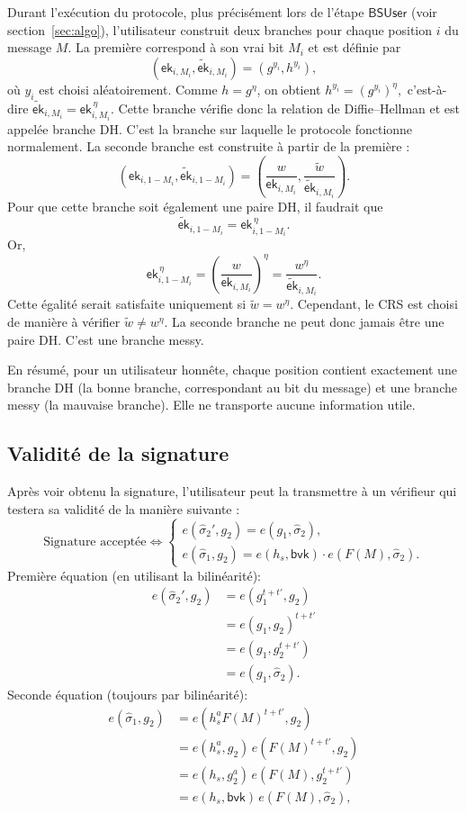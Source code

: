 \documentclass[10pt,a4paper]{article}
\theoremstyle{definition}
\theoremstyle{plain}
\theoremstyle{remark}
\begin{document}
Durant l'exécution du protocole, plus précisément lors de l'étape $\mathsf{BSUser}$ (voir section~\ref{sec:algo}),
l'utilisateur construit deux branches pour chaque position $i$ du message $M$.
La première correspond à son vrai bit $M_i$ et est définie par
\[
(\mathsf{ek}_{i,M_i},\widetilde{\mathsf{ek}}_{i,M_i})
=
(g^{y_i},h^{y_i}),
\]
où $y_i$ est choisi aléatoirement.
Comme $h=g^\eta$, on obtient
$
h^{y_i}=(g^{y_i})^\eta,
$
c'est-à-dire
$
\widetilde{\mathsf{ek}}_{i,M_i}
=
\mathsf{ek}_{i,M_i}^{\,\eta}.
$
Cette branche vérifie donc la relation de Diffie--Hellman et est appelée branche DH.
C'est la branche sur laquelle le protocole fonctionne normalement.
La seconde branche est construite à partir de la première :
\[
(\mathsf{ek}_{i,1-M_i},
\widetilde{\mathsf{ek}}_{i,1-M_i})
=
\left(
\frac{w}{\mathsf{ek}_{i,M_i}},
\frac{\widetilde w}{\widetilde{\mathsf{ek}}_{i,M_i}}
\right).
\]
Pour que cette branche soit également une paire DH, il faudrait que
\[
\widetilde{\mathsf{ek}}_{i,1-M_i}
=
\mathsf{ek}_{i,1-M_i}^{\,\eta}.
\]
Or,
\[
\mathsf{ek}_{i,1-M_i}^{\,\eta}
=
\left(\frac{w}{\mathsf{ek}_{i,M_i}}\right)^\eta
=
\frac{w^\eta}{\widetilde{\mathsf{ek}}_{i,M_i}}.
\]
Cette égalité serait satisfaite uniquement si
$
\widetilde w = w^\eta.
$
Cependant, le CRS est choisi de manière à vérifier
$
\widetilde w \neq w^\eta.
$
La seconde branche ne peut donc jamais être une paire DH. C'est une branche messy.

En résumé, pour un utilisateur honnête, chaque position contient exactement une branche DH 
(la bonne branche, correspondant au bit du message) et une branche messy (la mauvaise branche). 
Elle ne transporte aucune information utile.

\subsection{Validité de la signature}\label{sec:verification}

Après voir obtenu la signature, l'utilisateur peut la transmettre à un vérifieur qui testera sa validité de la manière suivante : 
\[
\text{Signature acceptée} \iff
\begin{cases}
e(\hat{\sigma}_2', g_2) = e(g_1, \hat{\sigma}_2), \\[0.5em]
e(\hat{\sigma}_1, g_2) = e(h_s, \mathsf{bvk}) \cdot e(F(M), \hat{\sigma}_2).
\end{cases}
\]
Première équation (en utilisant la bilinéarité):
\[
\begin{aligned}
e(\widehat{\sigma}_2',g_2)
&=
e(g_1^{t+t'},g_2)\\
&=
e(g_1,g_2)^{t+t'}\\
&=
e(g_1,g_2^{t+t'})\\
&=
e(g_1,\widehat{\sigma}_2).
\end{aligned}
\]
Seconde équation (toujours par bilinéarité):
\[
\begin{aligned}
e(\widehat{\sigma}_1,g_2)
&=
e(h_s^aF(M)^{t+t'},g_2)\\
&=
e(h_s^a,g_2)\,
e(F(M)^{t+t'},g_2)\\
&=
e(h_s,g_2^a)\,
e(F(M),g_2^{t+t'})\\
&=
e(h_s,\mathsf{bvk})\,
e(F(M),\widehat{\sigma}_2),
\end{aligned}
\]
\end{document}
